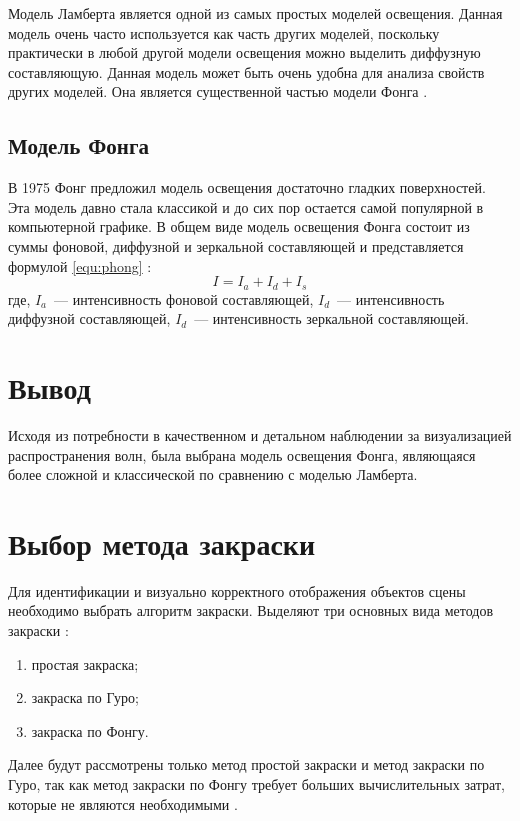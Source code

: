 Модель Ламберта является одной из самых простых моделей освещения.
Данная модель очень часто используется как часть других моделей, поскольку практически в любой другой модели освещения можно выделить диффузную составляющую.
Данная модель может быть очень удобна для анализа свойств других моделей.
Она является существенной частью модели Фонга \cite{baseLight}.

\subsection{Модель Фонга}

В 1975 Фонг предложил модель освещения достаточно гладких поверхностей.
Эта модель давно стала классикой и до сих пор остается самой популярной в компьютерной графике.
В общем виде модель освещения Фонга состоит из суммы фоновой, диффузной и зеркальной составляющей и представляется формулой \ref{equ:phong} \cite{baseLight}:
\begin{equation}
	\label{equ:phong}
	I = I_{a} + I_{d} + I_{s}
\end{equation}
где, $I_{a}$~--- интенсивность фоновой составляющей,
\newline $I_{d}$~--- интенсивность диффузной составляющей,
\newline $I_{d}$~--- интенсивность зеркальной составляющей.

\section*{Вывод}

Исходя из потребности в качественном и детальном наблюдении за визуализацией распространения волн, была выбрана модель освещения Фонга, являющаяся более сложной и классической по сравнению с моделью Ламберта.

\section{Выбор метода закраски}

Для идентификации и визуально корректного отображения объектов сцены необходимо выбрать алгоритм закраски.
Выделяют три основных вида методов закраски \cite{draw1}:
\begin{enumerate}
	\item простая закраска;
	\item закраска по Гуро;
	\item закраска по Фонгу.
\end{enumerate}
Далее будут рассмотрены только метод простой закраски и метод закраски по Гуро, так как метод закраски по Фонгу требует больших вычислительных затрат, которые не являются необходимыми \cite{base}.


